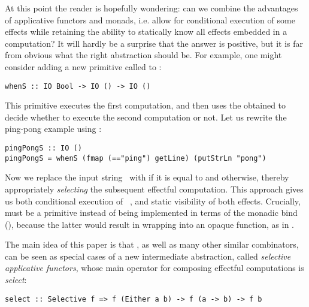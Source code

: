 At this point the reader is hopefully wondering: can we combine the advantages
of applicative functors and monads, i.e. allow for conditional execution of some
effects while retaining the ability to statically know all effects embedded in
a computation? It will hardly be a surprise that the answer is positive, but it
is far from obvious what the right abstraction should be. For example, one might
consider adding a new primitive called  to :

\vspace{0.5mm}
\begin{verbatim}
whenS :: IO Bool -> IO () -> IO ()
\end{verbatim}
\vspace{0.5mm}

\noindent
This primitive executes the first computation, and then uses the obtained
 to decide whether to execute the second computation or not. Let us
rewrite the ping-pong example using :

\vspace{0.5mm}
\begin{verbatim}
pingPongS :: IO ()
pingPongS = whenS (fmap (=="ping") getLine) (putStrLn "pong")
\end{verbatim}
\vspace{0.5mm}

\noindent
Now we replace the input string~ with  if it is equal to
 and  otherwise, thereby appropriately \emph{selecting} the
subsequent effectful computation. This approach gives us both conditional
execution of ~, and static visibility of both effects.
Crucially,  must be a primitive instead of being implemented in terms
of the monadic bind (\hs{>>=}), because the latter would result in wrapping
 into an opaque function, as in .

The main idea of this paper is that , as well as many other similar
combinators, can be seen as special cases of a new intermediate abstraction,
called \emph{selective applicative functors}, whose main operator for composing
effectful computations is \emph{select}:

\vspace{0.5mm}
\begin{verbatim}
select :: Selective f => f (Either a b) -> f (a -> b) -> f b
\end{verbatim}
\vspace{0.5mm}

